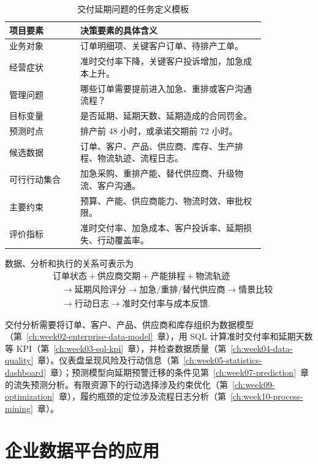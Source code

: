 \begin{table}[htbp]
\centering
\caption{交付延期问题的任务定义模板}
\begin{tabular}{P{0.23\linewidth}P{0.60\linewidth}}
\toprule
{}
项目要素 & 决策要素的具体含义\\
\midrule
业务对象 & 订单明细项、关键客户订单、待排产工单。\\
经营症状 & 准时交付率下降，关键客户投诉增加，加急成本上升。\\
管理问题 & 哪些订单需要提前进入加急、重排或客户沟通流程？\\
目标变量 & 是否延期、延期天数、延期造成的合同罚金。\\
预测时点 & 排产前 48 小时，或承诺交期前 72 小时。\\
候选数据 & 订单、客户、产品、供应商、库存、生产排程、物流轨迹、流程日志。\\
可行行动集合 & 加急采购、重排产能、替代供应商、升级物流、客户沟通。\\
主要约束 & 预算、产能、供应商能力、物流时效、审批权限。\\
评价指标 & 准时交付率、加急成本、客户投诉率、延期损失、行动覆盖率。\\
\bottomrule
\end{tabular}
\end{table}

数据、分析和执行的关系可表示为
\[
\begin{aligned}
&\text{订单状态}+\text{供应商交期}+\text{产能排程}+\text{物流轨迹}\\
&\quad\longrightarrow \text{延期风险评分}
\longrightarrow \text{加急/重排/替代供应商}
\longrightarrow \text{情景比较}\\
&\quad\longrightarrow \text{行动日志}
\longrightarrow \text{准时交付率与成本反馈}.
\end{aligned}
\]

交付分析需要将订单、客户、产品、供应商和库存组织为数据模型（第~\ref{ch:week02-enterprise-data-model}~章），用 SQL 计算准时交付率和延期天数等 KPI（第~\ref{ch:week03-sql-kpi}~章），并检查数据质量（第~\ref{ch:week04-data-quality}~章）。仪表盘呈现风险及行动信息（第~\ref{ch:week05-statistics-dashboard}~章）；预测模型向延期预警迁移的条件见第~\ref{ch:week07-prediction}~章的流失预测分析。有限资源下的行动选择涉及约束优化（第~\ref{ch:week09-optimization}~章），履约瓶颈的定位涉及流程日志分析（第~\ref{ch:week10-process-mining}~章）。

\section{企业数据平台的应用}

